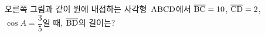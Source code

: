 \noindent\begin{minipage}[t]{0.58\linewidth}\vspace{0pt}\raggedright 오른쪽 그림과 같이 원에 내접하는 사각형~$\mathrm{ABCD}$에서 $\overline{\mathrm{BC}}=10$, $\overline{\mathrm{CD}}=2$, $\cos A=\dfrac{3}{5}$일 때, $\overline{\mathrm{BD}}$의 길이는?\end{minipage}\hfill\begin{minipage}[t]{0.4\linewidth}\vspace{0pt}\centering \resizebox{\ifdim\width>\linewidth\linewidth\else\width\fi}{!}{}\end{minipage}\par
{}
